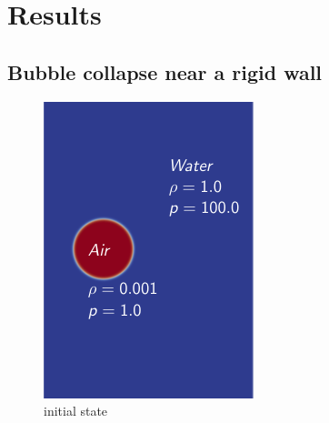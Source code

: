 \documentclass[12pt]{article}
\begin{document}
\section*{Results}
\subsection*{Bubble collapse near a rigid wall}
\begin{figure}[h]
	\centering
	\begin{minipage}[b]{0.3\textwidth}
	  	\includegraphics[width=\textwidth]{initial_bubble.png}
	  \caption{initial state}
	  \label{initial condition}
	\end{minipage}
	\hfill
	\begin{minipage}[b]{0.42\textwidth}

\end{minipage}
\end{figure}
\end{document}
